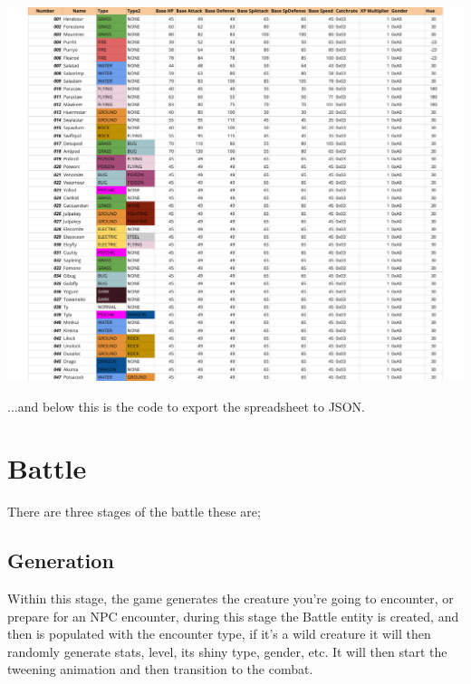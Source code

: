 \documentclass[11pt,a4paper]{article}
\begin{document}
\begin{adjustwidth}{-127pt}{100pt}
\includegraphics[scale=1.2]{pdfs/Ikimono_sheet.pdf}
\end{adjustwidth}
\nepwage ...and below this is the code to export the spreadsheet to JSON.


\newpage
\section{Battle}
There are three stages of the battle these are;
\subsection{Generation}
Within this stage, the game generates the creature you're going to encounter, or prepare for an NPC encounter, during this stage the Battle entity is created, and then is populated with the encounter type, if it's a wild creature it will then randomly generate stats, level, its shiny type, gender, etc. It will then start the tweening animation and then transition to the combat. 
\end{document}
